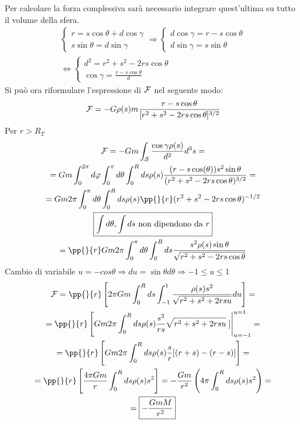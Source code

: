 \documentclass[Main.tex]{subfiles}
\begin{document}
Per calcolare la forza complessiva sarà necessario integrare quest'ultima su tutto il volume della sfera.
\begin{gather}
	\begin{cases}
		r= s\cos \theta + d \cos \gamma \\ 
		s \sin \theta = d \sin \gamma 
	\end{cases} \Rightarrow \begin{cases}
 	d \cos \gamma = r - s \cos \theta \\ d \sin \gamma = s \sin \theta 
 \end{cases}  \\ \iff \begin{cases}
 	d^2=r^2 + s^2 -2r s \cos \theta \\ \cos \gamma = \frac{r- s \cos \theta}{d}
 \end{cases}
\end{gather}
Si può ora riformulare l'espressione di $\mathcal{F}$ nel seguente modo:
\begin{equation}
	\mathcal{F} = -G \rho (s) m \frac{r - s \cos \theta}{[ r^2 + s^2 -2rs \cos \theta ]^{3/2}}
\end{equation}
Per $r > R_T$
\begin{gather}
	\F = -G m \int_{\S} \frac{\cos \gamma \rho (s)}{d^2} d^3s = \\ =Gm \int_0^{2\pi} d \varphi \int_0^\pi d \theta \int _0^R ds \rho(s) 	\frac{(r- s \cos(\theta)) s^2 \sin \theta}{(r^2 +s^2 -2rs \cos \theta)^{3/2}}= \notag\\ =Gm 2 \pi \int_0^\pi d \theta \int_0^R ds \rho(s) \pp{}{r} (r^2 + s^2 -2rs \cos \theta )^{-1/2} \\ \boxed{\int d\theta , \int ds\text{ non dipendono da $r$}}\\
	=\pp{}{r} Gm 2 \pi \int_0^\pi d \theta \int_0 ^R ds \frac{s^2 \rho(s) \sin \theta}{ \sqrt{r^2 + s^2 -2rs \cos \theta}}
\end{gather}
Cambio di variabile $u=-cos \theta \Rightarrow du = \sin \theta d \theta \Rightarrow-1\leq u \leq 1$
\begin{gather}
	\F = \pp{}{r} \left[ 2 \pi Gm \int_0^R ds \int_{-1}^{1} \frac{ \rho(s) s^2}{\sqrt{r^2 + s^2 + 2r  s u}} du \right] =  \\
	= \pp{}{r} \left[ Gm 2 \pi \int_0^R ds \rho(s)  \frac{s^2}{rs} \sqrt{r^2 + s^2 + 2rsu} \left.  \right] \right|_{u=-1}^{u=1}=\\
	= \pp{}{r} \left[ Gm 2 \pi \int_0^R ds \rho(s) \frac{s}{r}[( r + s) -(r-s)] \right]= \\
	=\pp{}{r} \left[\frac{4 \pi Gm}{r} \int_0^R ds \rho (s) s^2 \right]= -\frac{Gm}{r^2} \left( 4 \pi \int_0^R ds \rho(s) s^2\right)= \notag \\ =\boxed{- \frac{GmM}{r^2}} 
\end{gather}
\end{document}
